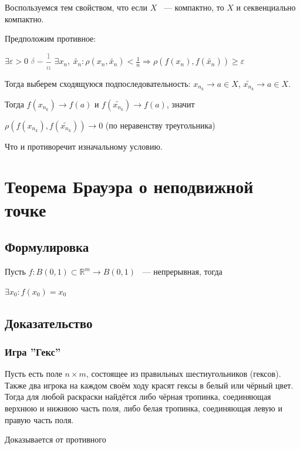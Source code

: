\documentclass{article}
\begin{document}
			Воспользуемся тем свойством, что если $X$ ~--- компактно, то $X$ и секвенциально компактно.
			
			Предположим противное:
			
			$\exists \varepsilon > 0$ \textcolor{gray}{$\delta = \dfrac{1}{n}$} $\exists x_n, \ \widetilde{x_n} : \rho(x_n, \widetilde{x_n}) < \frac{1}{n} \Rightarrow \rho(f(x_n), f(\widetilde{x_n})) \geq \varepsilon$
			
			Тогда выберем сходящуюся подпоследовательность: $x_{n_k} \rightarrow a \in X$, $\widetilde{x_{n_k}} \rightarrow a \in X$.
			
			Тогда $f(x_{n_k}) \rightarrow f(a)$ и $f(\widetilde{x_{n_k}}) \rightarrow f(a)$, значит
			
			$\rho(f(x_{n_k}), f(\widetilde{x_{n_k}})) \rightarrow 0$ (по неравенству треугольника)
			
			Что и противоречит изначальному условию.

	\newpage
	
	\section{Теорема Брауэра о неподвижной точке}
	
		\subsection{Формулировка}
            
            Пусть $f: B(0, 1) \subset \mathbb{R}^m \rightarrow B(0, 1)$ ~--- непрерывная, тогда
		
            $\exists x_0 : f(x_0) = x_0$
		
		\subsection{Доказательство}
		
		\subsubsection{Игра ''Гекс''}
		
			Пусть есть поле $n \times m$, состоящее из правильных шестиугольников (гексов). Также два игрока на каждом своём ходу красят гексы в белый или чёрный цвет. Тогда для любой раскраски найдётся либо чёрная тропинка, соединяющая верхнюю и нижнюю часть поля, либо белая тропинка, соединяющая левую и правую часть поля.
			
			Доказывается от противного
		
\end{document}
